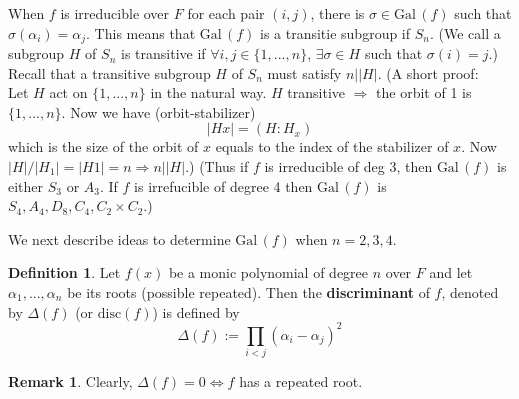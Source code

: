 \documentclass{article}
\theoremstyle{definition}
\newtheorem{dfn}{Definition}
\newtheorem{rem}{Remark}
\newcommand{\Ra}{\Rightarrow}
\newcommand{\Lra}{\Leftrightarrow}
\newcommand{\Gal}{\text{Gal}\,}
\begin{document}
\par When $f$ is irreducible over $F$ for each pair $(i, j)$, there is $\sigma \in \Gal(f)$ such that $\sigma(\alpha_i) = \alpha_j$.
This means that $\Gal(f)$ is a transitie subgroup if $S_n$.
(We call a subgroup $H$ of $S_n$ is transitive if $\forall i,j \in \{1, ..., n\}$, $\exists \sigma \in H$ such that $\sigma(i) = j$.)
Recall that a transitive subgroup $H$ of $S_n$ must satisfy $n | |H|$.
(A short proof:\\
Let $H$ act on $\{1, ..., n\}$ in the natural way.
$H$ transitive $\Ra$ the orbit of 1 is $\{1, ..., n\}$.
Now we have (orbit-stabilizer)
\[
	|Hx| = (H:H_x)
\]
which is the size of the orbit of $x$ equals to the index of the stabilizer of $x$.
Now $|H|/|H_1| = |H1| = n \Ra n | |H|$.)
(Thus if $f$ is irreducible of deg 3, then $\Gal(f)$ is either $S_3$ or $A_3$. 
If $f$ is irrefucible of degree 4 then $\Gal(f)$ is $S_4, A_4, D_8, C_4, C_2 \times C_2$.)

\par We next describe ideas to determine $\Gal(f)$ when $n = 2, 3, 4$.

\begin{dfn}
	Let $f(x)$ be a monic polynomial of degree $n$ over $F$ and let $\alpha_1, ..., \alpha_n$ be its roots (possible repeated).
	Then the \textbf{discriminant} of $f$, denoted by $\Delta(f)$ (or $\text{disc}(f)$) is defined by 
	\[
		\Delta(f) := \prod_{i < j} (\alpha_i - \alpha_j)^2
	\]
\end{dfn}

\begin{rem}
	Clearly, $\Delta(f) = 0 \Lra f$ has a repeated root.
\end{rem}
\end{document}
